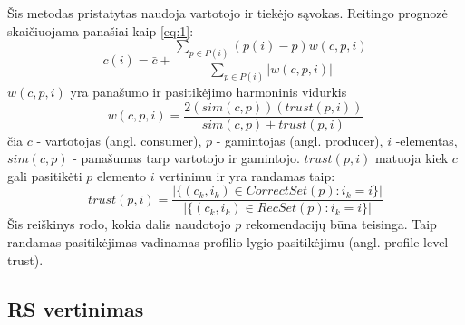 \documentclass{VUMIFInfMagistrinis}
\begin{document}
Šis metodas pristatytas \cite{12} naudoja vartotojo ir tiekėjo sąvokas. Reitingo prognozė skaičiuojama panašiai kaip \eqref{eq:1}:
\begin{equation}
c(i) = \bar{c}+\frac{\sum \limits_{p \in P(i)} (p(i) - \bar{p}) w(c,p,i)}{\sum \limits_{p \in P(i)} |w(c,p,i)|}
\end{equation}
$w(c,p,i)$ yra panašumo ir pasitikėjimo harmoninis vidurkis 
\begin{equation}
w(c,p,i) = \frac{2(sim(c,p))(trust(p,i))}{sim(c,p)+trust(p,i)}
\end{equation}
čia $c$ - vartotojas (angl. consumer), $p$ - gamintojas (angl. producer), $i$ -elementas, $sim(c, p)$ - panašumas tarp vartotojo ir gamintojo. $trust(p,i)$ matuoja kiek $c$ gali pasitikėti $p$ elemento $i$ vertinimu ir yra randamas taip:
\begin{equation}
trust(p,i)=\frac{|\{(c_k, i_k) \in CorrectSet(p): i_k = i\}|}{|\{(c_k,i_k) \in RecSet(p): i_k=i\}|}
\end{equation}
Šis reiškinys rodo, kokia dalis naudotojo $p$ rekomendacijų būna teisinga. Taip randamas pasitikėjimas vadinamas profilio lygio pasitikėjimu (angl. profile-level trust).

\subsection{RS vertinimas}
\end{document}
